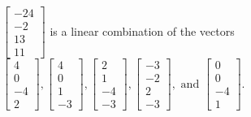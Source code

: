 \begin{exercise}
\begin{exerciseStatement}
  \end{exerciseStatement}
  \begin{exerciseAnswer}
   \(\left[\begin{array}{c}
-24 \\
-2 \\
13 \\
11
\end{array}\right]\) 
  	 is  
	a linear combination of the vectors \(\left[\begin{array}{c}
4 \\
0 \\
-4 \\
2
\end{array}\right] , \left[\begin{array}{c}
4 \\
0 \\
1 \\
-3
\end{array}\right] , \left[\begin{array}{c}
2 \\
1 \\
-4 \\
-3
\end{array}\right] , \left[\begin{array}{c}
-3 \\
-2 \\
2 \\
-3
\end{array}\right] , \text{ and } \left[\begin{array}{c}
0 \\
0 \\
-4 \\
1
\end{array}\right]\).

	
  


  \end{exerciseAnswer}
\end{exercise}